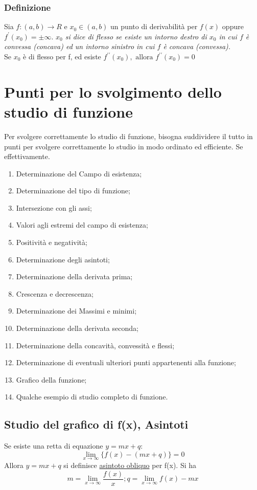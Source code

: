 \subsubsection{Definizione}
Sia $f:(a,b)\to R$ e $x_0\in (a,b)$ un punto di derivabilità per $f(x)$ oppure
$f^\prime(x_0)=\pm\infty$. \textit{$x_0$ si dice di flesso se esiste un intorno
destro di $x_0$ in cui $f$ è convessa (concava) ed un intorno sinistro in cui
$f$ è concava (convessa).}\\
Se $x_0$ è di flesso per f, ed esiste $f^{\prime\prime} (x_0),\text{ allora }
f^{\prime\prime}(x_0)=0$

\section{Punti per lo svolgimento dello studio di funzione}
Per svolgere correttamente lo studio di funzione, bisogna suddividere il tutto
in punti per svolgere correttamente lo studio in modo ordinato ed efficiente.
Se effettivamente.
\begin{enumerate}
	\item Determinazione del Campo di esistenza;
	\item Determinazione del tipo di funzione;
	\item Intersezione con gli assi;
	\item Valori agli estremi del campo di esistenza;
	\item Positività e negatività;
	\item Determinazione degli asintoti;
	\item Determinazione della derivata prima;
	\item Crescenza e decrescenza;
	\item Determinazione dei Massimi e minimi;
	\item Determinazione della derivata seconda;
	\item Determinazione della concavità, convessità e flessi;
	\item Determinazione di eventuali ulteriori punti appartenenti alla
		funzione;
	\item Grafico della funzione;
	\item Qualche esempio di studio completo di funzione.
\end{enumerate}
\subsection{Studio del grafico di f(x), Asintoti}
Se esiste una retta di equazione $y=mx+q$:
\begin{equation*}
	\lim_{x\to\infty}\{f(x)- (mx+q)\}=0
\end{equation*}
Allora $y=mx+q$ si definisce \underline{\color{red}asintoto obliquo} per f(x).
Si ha
\begin{equation*}
	m=\lim_{x\to \infty}\frac{f(x)}{x}; q=\lim_{x\to \infty} f(x)-mx
\end{equation*}

